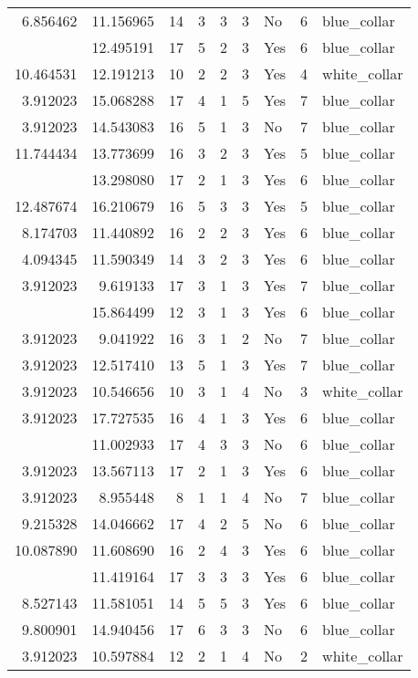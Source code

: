 \documentclass[
]{article}
\begin{document}
\begin{longtable}[t]{rrrrrllrl}
6.856462 & 11.156965 & 14 & 3 & 3 & 3 & No & 6 & blue\_collar\\
\addlinespace
10.205442 & 12.495191 & 17 & 5 & 2 & 3 & Yes & 6 & blue\_collar\\
10.464531 & 12.191213 & 10 & 2 & 2 & 3 & Yes & 4 & white\_collar\\
3.912023 & 15.068288 & 17 & 4 & 1 & 5 & Yes & 7 & blue\_collar\\
3.912023 & 14.543083 & 16 & 5 & 1 & 3 & No & 7 & blue\_collar\\
11.744434 & 13.773699 & 16 & 3 & 2 & 3 & Yes & 5 & blue\_collar\\
\addlinespace
3.912023 & 13.298080 & 17 & 2 & 1 & 3 & Yes & 6 & blue\_collar\\
12.487674 & 16.210679 & 16 & 5 & 3 & 3 & Yes & 5 & blue\_collar\\
8.174703 & 11.440892 & 16 & 2 & 2 & 3 & Yes & 6 & blue\_collar\\
4.094345 & 11.590349 & 14 & 3 & 2 & 3 & Yes & 6 & blue\_collar\\
3.912023 & 9.619133 & 17 & 3 & 1 & 3 & Yes & 7 & blue\_collar\\
\addlinespace
3.912023 & 15.864499 & 12 & 3 & 1 & 3 & Yes & 6 & blue\_collar\\
3.912023 & 9.041922 & 16 & 3 & 1 & 2 & No & 7 & blue\_collar\\
3.912023 & 12.517410 & 13 & 5 & 1 & 3 & Yes & 7 & blue\_collar\\
3.912023 & 10.546656 & 10 & 3 & 1 & 4 & No & 3 & white\_collar\\
3.912023 & 17.727535 & 16 & 4 & 1 & 3 & Yes & 6 & blue\_collar\\
\addlinespace
8.022897 & 11.002933 & 17 & 4 & 3 & 3 & No & 6 & blue\_collar\\
3.912023 & 13.567113 & 17 & 2 & 1 & 3 & Yes & 6 & blue\_collar\\
3.912023 & 8.955448 & 8 & 1 & 1 & 4 & No & 7 & blue\_collar\\
9.215328 & 14.046662 & 17 & 4 & 2 & 5 & No & 6 & blue\_collar\\
10.087890 & 11.608690 & 16 & 2 & 4 & 3 & Yes & 6 & blue\_collar\\
\addlinespace
8.022897 & 11.419164 & 17 & 3 & 3 & 3 & Yes & 6 & blue\_collar\\
8.527143 & 11.581051 & 14 & 5 & 5 & 3 & Yes & 6 & blue\_collar\\
9.800901 & 14.940456 & 17 & 6 & 3 & 3 & No & 6 & blue\_collar\\
3.912023 & 10.597884 & 12 & 2 & 1 & 4 & No & 2 & white\_collar\\

\end{longtable}
\end{document}
